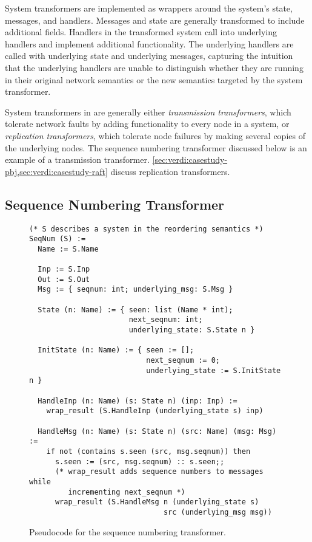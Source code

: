 System transformers are implemented as wrappers around the system's state,
messages, and handlers. Messages and state are generally transformed to
include additional fields.  Handlers in the transformed system call into
underlying handlers and implement additional functionality.  The underlying
handlers are called with underlying state and underlying messages,
capturing the intuition that the underlying handlers are unable to
distinguish whether they are running in their original network semantics or
the new semantics targeted by the system transformer.

System transformers in \Verdi are generally either
\textit{transmission transformers}, which tolerate network faults by
adding functionality to every node in a system, or \textit{replication
  transformers}, which tolerate node failures by making several copies
of the underlying nodes. The sequence numbering transformer discussed
below is an example of a transmission
transformer. \cref{sec:verdi:casestudy-pbj,sec:verdi:casestudy-raft} discuss
replication transformers.

\subsection{Sequence Numbering Transformer}

\begin{figure}
\begin{lstlisting}[language=caml,basicstyle=\scriptsize\tt,morekeywords={output,send,nop}]
(* S describes a system in the reordering semantics *)
SeqNum (S) :=
  Name := S.Name

  Inp := S.Inp
  Out := S.Out
  Msg := { seqnum: int; underlying_msg: S.Msg }

  State (n: Name) := { seen: list (Name * int);
                       next_seqnum: int;
                       underlying_state: S.State n }

  InitState (n: Name) := { seen := [];
                           next_seqnum := 0;
                           underlying_state := S.InitState n }

  HandleInp (n: Name) (s: State n) (inp: Inp) :=
    wrap_result (S.HandleInp (underlying_state s) inp)

  HandleMsg (n: Name) (s: State n) (src: Name) (msg: Msg) :=
    if not (contains s.seen (src, msg.seqnum)) then
      s.seen := (src, msg.seqnum) :: s.seen;;
      (* wrap_result adds sequence numbers to messages while
         incrementing next_seqnum *)
      wrap_result (S.HandleMsg n (underlying_state s)
                               src (underlying_msg msg))

\end{lstlisting}
\caption{Pseudocode for the sequence numbering transformer.}
\label{fig:seqnum}
\end{figure}


